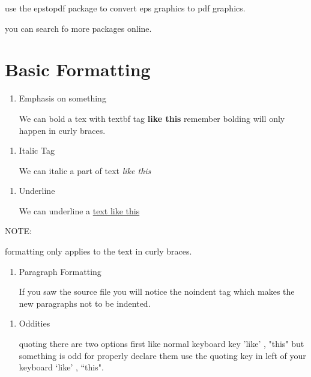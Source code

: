 \documentclass{article} %
\begin{document}
        \noindent use the epstopdf package to convert eps graphics to pdf graphics.
    
        \noindent you can search fo more packages online.
    
\section{Basic Formatting}

    \begin{enumerate}
        \item Emphasis on something  
        
        \qquad We can bold a tex with textbf tag \textbf{ like this } remember bolding will only happen in curly braces.
    \end{enumerate}
        
 
    
    \begin{enumerate}[resume]
        \item Italic Tag
        
        \qquad We can italic a part of text \emph{like this}
    \end{enumerate}
    

    
    \begin{enumerate}[resume]
        \item Underline
        
        \qquad We can underline a \underline{text like this}
    \end{enumerate}
    
    
    \noindent NOTE:
    
    formatting only applies to the text in curly braces.
    
    \begin{enumerate}[resume]
        \item Paragraph Formatting 
        
        \qquad If you saw the source file you will notice the noindent tag which makes the new paragraphs not to be indented.
    \end{enumerate}
    
        
    \begin{enumerate}[resume]
        \item Oddities
        
        \qquad quoting there are two options first like normal keyboard key 'like' , "this" but something is odd for properly declare them use the  quoting key in left of your keyboard `like' , ``this".
        
    \end{enumerate}
    
\end{document}
